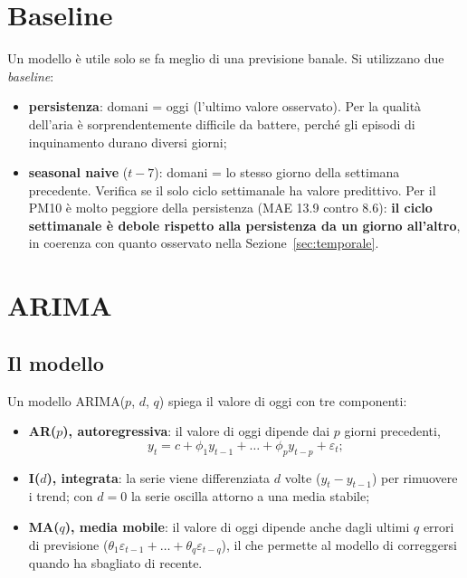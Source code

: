 \documentclass[11pt]{report}
\begin{document}
\section{Baseline}
\label{sec:fc_baseline}

Un modello è utile solo se fa meglio di una previsione banale. Si utilizzano due
\emph{baseline}:
\begin{itemize}
  \item \textbf{persistenza}: domani = oggi (l'ultimo valore osservato). Per la
        qualità dell'aria è sorprendentemente difficile da battere, perché gli
        episodi di inquinamento durano diversi giorni;
  \item \textbf{seasonal naive} ($t-7$): domani = lo stesso giorno della settimana
        precedente. Verifica se il solo ciclo settimanale ha valore predittivo. Per
        il PM10 è molto peggiore della persistenza (MAE \num{13.9} contro
        \num{8.6}): \textbf{il ciclo settimanale è debole rispetto alla persistenza
        da un giorno all'altro}, in coerenza con quanto osservato nella
        Sezione~\ref{sec:temporale}.
\end{itemize}

\section{ARIMA}
\label{sec:fc_arima}

\subsection{Il modello}
Un modello ARIMA($p$, $d$, $q$) spiega il valore di oggi con tre componenti:
\begin{itemize}
  \item \textbf{AR($p$), autoregressiva}: il valore di oggi dipende dai $p$ giorni
        precedenti,
        \[ y_t = c + \phi_1 y_{t-1} + \dots + \phi_p y_{t-p} + \varepsilon_t; \]
  \item \textbf{I($d$), integrata}: la serie viene differenziata $d$ volte
        ($y_t - y_{t-1}$) per rimuovere i trend; con $d=0$ la serie oscilla
        attorno a una media stabile;
  \item \textbf{MA($q$), media mobile}: il valore di oggi dipende anche dagli
        ultimi $q$ errori di previsione ($\theta_1\varepsilon_{t-1} + \dots +
        \theta_q\varepsilon_{t-q}$), il che permette al modello di correggersi
        quando ha sbagliato di recente.
\end{itemize}
\end{document}
